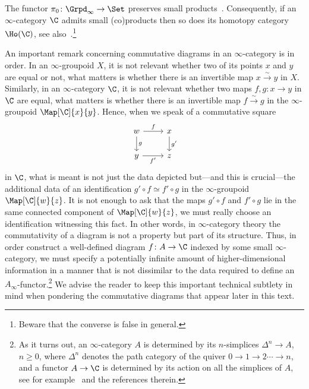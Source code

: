 \documentclass[a4paper]{amsart}
\begin{document}
\begin{remark}
  The functor $\pi_0\colon\Grpd_\infty\to\Set$ preserves small
  products~\cite[\href{https://kerodon.net/tag/00HD}{Corollary~00HD}]{kerodon}.
  Consequently, if an $\infty$-category $\C$ admits small (co)products then so
  does its homotopy category $\Ho(\C)$, see
  also~\cite[Proposition~6.5.5]{Cis19}.\footnote{Beware that the converse is
    false in general.}
\end{remark}

\begin{remark}
  An important remark concerning commutative diagrams in an $\infty$-category is
  in order. In an $\infty$-groupoid $X$, it is not relevant whether two of its
  points $x$ and $y$ are equal or not, what matters is whether there is an
  invertible map ${x\stackrel{\sim}{\to} y}$ in $X$. Similarly, in an
  $\infty$-category $\C$, it is not relevant whether two maps $f,g\colon x\to y$
  in $\C$ are equal, what matters is whether there is an invertible map
  ${f\stackrel{\sim}{\to} g}$ in the $\infty$-groupoid $\Map[\C]{x}{y}$. Hence,
  when we speak of a commutative square
  \[
    \begin{tikzcd}
      w\rar{f}\dar{g}&x\dar{g'}\\
      y\rar[swap]{f'}&z
    \end{tikzcd}
  \]
  in $\C$, what is meant is not just the data depicted but---and this is
  crucial---the additional data of an identification $g'\circ f\simeq f'\circ g$
  in the $\infty$-groupoid $\Map[\C]{w}{z}$. It is not enough to ask that the
  maps $g'\circ f$ and $f'\circ g$ lie in the same connected component of
  $\Map[\C]{w}{z}$, we must really choose an identification witnessing this
  fact. In other words, in $\infty$-category theory the commutativity of a
  diagram is not a property but part of its structure. Thus, in order construct
  a well-defined diagram $f\colon A\to \C$ indexed by some small
  $\infty$-category, we must specify a potentially infinite amount of
  higher-dimensional information in a manner that is not dissimilar to the data
  required to define an $A_\infty$-functor.\footnote{As it turns out, an
    $\infty$-category $A$ is determined by its $n$-simplices $\Delta^n\to A$,
    $n\geq0$, where $\Delta^n$ denotes the path category of the quiver
    $0\to1\to2\cdots\to n$, and a functor $A\to\C$ is determined by its action
    on all the simplices of $A$, see for example~\cite{HS25a} and the references therein.} We advise the reader to keep this important
  technical subtlety in mind when pondering the commutative diagrams that appear
  later in this text.
\end{remark}
\end{document}

